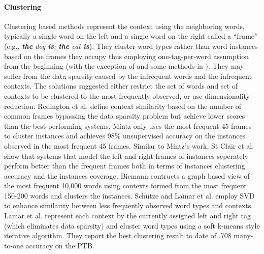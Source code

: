 \paragraph{Clustering}
Clustering based methods represent the context using the neighboring
words, typically a single word on the left and a single word on the
right called a ``frame'' (e.g., {\em {\bf the} dog {\bf is}; {\bf the}
  cat {\bf is}}).  They cluster word types rather than word instances 
based on the frames they occupy thus employing one-tag-per-word
assumption from the beginning (with the exception of
\cite{mintz2003frequent,20674613} and some methods in
\cite{Schutze:1995:DPT:976973.976994}).  They may suffer from the data
sparsity caused by the infrequent words and the infrequent contexts.
The solutions suggested either restrict the set of words and set of
contexts to be clustered to the most frequently observed, or use
dimensionality reduction.  Redington et
al.  define context similarity
based on the number of common frames bypassing the data sparsity
problem but achieve lower scores than the best performing systems.
Mintz  only uses the most frequent 45
frames to cluster instances and achieves 98\% unsupervised accuracy on
the instances observed in the most frequent 45 frames.  Similar to
Mintz's work, St Clair et al.  show that systems
that model the left and right frames of instances seperately perform
better than the frequent frames both in terms of instances clustering
accuracy and the instances coverage.  Biemann
 contructs a graph based view of
the most frequent 10,000 words using contexts formed from the most
frequent 150-200 words and clusters the instances.  Sch\"utze
 and Lamar et
al.  employ SVD to enhance similarity
between less frequently observed word types and contexts.  Lamar et
al.  represent each context
by the currently assigned left and right tag (which eliminates data
sparsity) and cluster word types using a soft k-means style iterative
algorithm.  They report the best clustering result to date of .708
many-to-one accuracy on the PTB.

